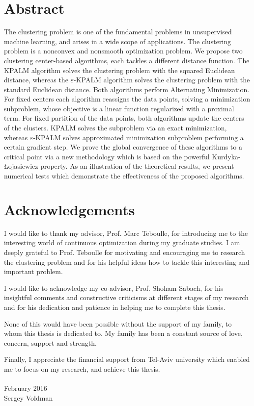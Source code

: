 \setcounter{page}{3}
\chapter*{Abstract}

The clustering problem is one of the fundamental problems in unsupervised machine learning, and arises in a wide scope of applications. The clustering problem is a nonconvex and nonsmooth optimization problem. 
We propose two clustering center-based algorithms, each tackles a different distance function. The KPALM algorithm solves the clustering problem with the squared Euclidean distance, whereas the $\varepsilon$-KPALM algorithm solves the clustering problem with the standard Euclidean distance. 
Both algorithms perform Alternating Minimization. For fixed centers each algorithm reassigns the data points, solving a minimization subproblem, whose objective is a linear function regularized with a proximal term. For fixed partition of the data points, both algorithms update the centers of the clusters. KPALM solves the subproblem via an exact minimization, whereas $\varepsilon$-KPALM solves approximated minimization subproblem performing a certain gradient step.
We prove the global convergence of these algorithms to a critical point via a new methodology which is based on the powerful Kurdyka-{\L}ojasiewicz property. 
As an illustration of the theoretical results, we present numerical tests which demonstrate the effectiveness of the proposed algorithms.



\chapter*{Acknowledgements}

I would like to thank my advisor, Prof. Marc Teboulle, for introducing me to the interesting world of continuous optimization during my graduate studies. I am deeply grateful to Prof. Teboulle for motivating and encouraging me to research the clustering problem and for his helpful ideas how to tackle this interesting and important problem.

I would like to acknowledge my co-advisor, Prof. Shoham Sabach, for his insightful comments and constructive criticisms at different stages of my research and for his dedication and patience in helping me to complete this thesis.

None of this would have been possible without the support of my family, to whom this thesis is dedicated to. My family has been a constant source of love, concern, support and strength.

Finally, I appreciate the financial support from Tel-Aviv university which enabled me to focus on my research, and achieve this thesis.
\\
\\
\noindent February 2016\\
\noindent Sergey Voldman



\nobreak
